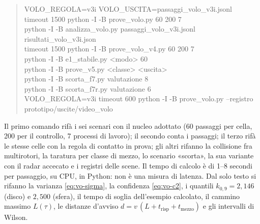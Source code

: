 \begin{quote}\small\ttfamily
VOLO\_REGOLA=v3i VOLO\_USCITA=passaggi\_volo\_v3i.jsonl \\\quad timeout 1500 python -I -B prove\_volo.py 60 200 7\\
python -I -B analizza\_volo.py passaggi\_volo\_v3i.jsonl risultati\_volo\_v3i.json\\
timeout 1500 python -I -B prove\_volo\_v4.py 60 200 7\\
python -I -B e1\_stabile.py <modo> 60\\
python -I -B prove\_v5.py <classe> <uscita>\\
python -I -B scorta\_f7.py valutazione 8\\
python -I -B scorta\_f7r.py valutazione 6\\
VOLO\_REGOLA=v3i timeout 600 python -I -B prove\_volo.py --registro prototipo/uscite/video\_volo
\end{quote}
Il primo comando rifà i sei scenari con il nucleo adottato (60 passaggi per cella, 200 per il controllo, 7 processi di lavoro); il secondo conta i passaggi; il terzo rifà le stesse celle con la regola di contatto in prova; gli altri rifanno la collisione fra multirotori, la taratura per classe di mezzo, lo scenario «scorta», la sua variante con il radar accecato e i registri delle scene. Il tempo di calcolo è di 1--8 secondi per passaggio, su CPU, in Python: non è una misura di latenza. Dal solo testo si rifanno la varianza \eqref{eq:vo-sigma}, la confidenza \eqref{eq:vo-c2}, i quantili $k_{0,9}=2{,}146$ (disco) e $2{,}500$ (sfera), il tempo di soglia dell'esempio calcolato, il cammino massimo $L(\tau)$, le distanze d'avviso $d=v\,(L+t_{\mathrm{risp}}+t_{\mathrm{mezzo}})$ e gli intervalli di Wilson.
